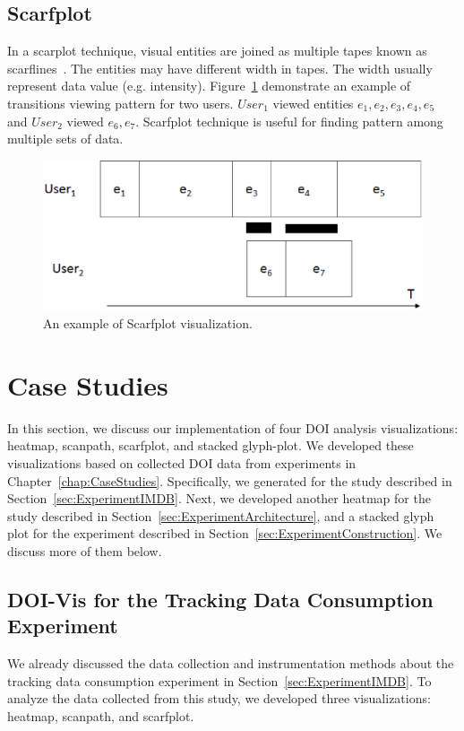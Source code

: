 \subsection{Scarfplot}
In a scarplot technique, visual entities are joined as multiple tapes known as scarflines~\cite{richardson2005looking}. The entities may have different width in tapes. The width usually represent data value (e.g. intensity). Figure~\ref{fig:scarfplotExample} demonstrate an example of transitions viewing pattern for two users. $User_1$ viewed entities $e_1, e_2, e_3, e_4,e_5$ and $User_2$ viewed $e_6, e_7$. Scarfplot technique is useful for finding pattern among multiple sets of data. 
\begin{figure}[htbp]
  \centering
  \includegraphics[width=\linewidth]{images/ScarfplotExample.eps}
  \caption{An example of Scarfplot visualization. }
	\label{fig:scarfplotExample}
\end{figure}

\section{Case Studies}
In this section, we discuss our implementation of four DOI analysis visualizations: heatmap, scanpath, scarfplot, and stacked glyph-plot. We developed these visualizations based on collected DOI data from experiments in Chapter~\ref{chap:CaseStudies}. Specifically, we generated for the study described in Section~\ref{sec:ExperimentIMDB}. Next, we developed another heatmap for the study described in Section~\ref{sec:ExperimentArchitecture}, and a stacked glyph plot for the experiment described in Section~\ref{sec:ExperimentConstruction}. We discuss more of them below. 

\subsection{DOI-Vis for the Tracking Data Consumption Experiment}
We already discussed the data collection and instrumentation methods about the tracking data consumption experiment in Section~\ref{sec:ExperimentIMDB}. To analyze the data collected from this study, we developed three visualizations: heatmap, scanpath, and scarfplot. 

